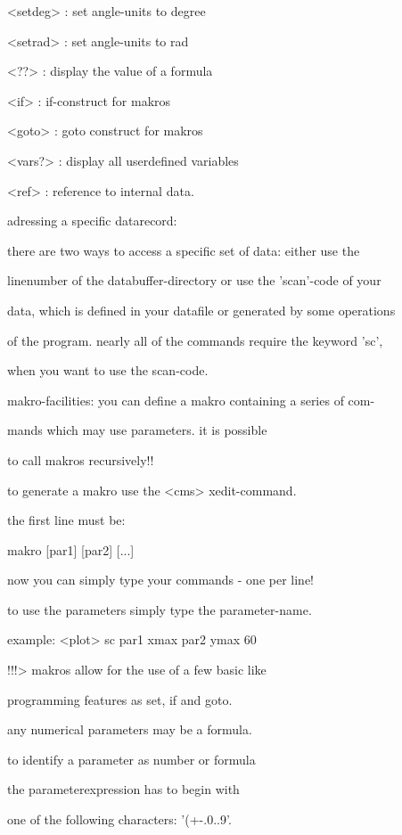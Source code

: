\documentclass[]{article}
\begin{document}
\textless{}setdeg\textgreater{} : set angle-units to degree

\textless{}setrad\textgreater{} : set angle-units to rad

\textless{}??\textgreater{} : display the value of a formula

\textless{}if\textgreater{} : if-construct for makros

\textless{}goto\textgreater{} : goto construct for makros

\textless{}vars?\textgreater{} : display all userdefined variables

\textless{}ref\textgreater{} : reference to internal data.

adressing a specific datarecord:

there are two ways to access a specific set of data: either use the

linenumber of the databuffer-directory or use the 'scan'-code of your

data, which is defined in your datafile or generated by some operations

of the program. nearly all of the commands require the keyword 'sc',

when you want to use the scan-code.

makro-facilities: you can define a makro containing a series of com-

mands which may use parameters. it is possible

to call makros recursively!!

to generate a makro use the \textless{}cms\textgreater{} xedit-command.

the first line must be:

makro {[}par1{]} {[}par2{]} {[}...{]}

now you can simply type your commands - one per line!

to use the parameters simply type the parameter-name.

example: \textless{}plot\textgreater{} sc par1 xmax par2 ymax 60

!!!\textgreater{} makros allow for the use of a few basic like

programming features as set, if and goto.

any numerical parameters may be a formula.

to identify a parameter as number or formula

the parameterexpression has to begin with

one of the following characters: '(+-.0..9'.
\end{document}
